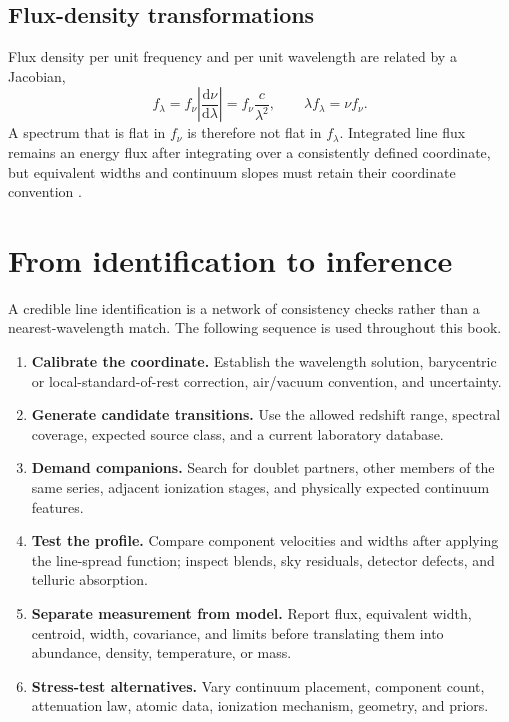 \subsection{Flux-density transformations}

Flux density per unit frequency and per unit wavelength are related by a Jacobian,
\begin{equation}
 f_\lambda = f_\nu\left|\frac{\mathrm d\nu}{\mathrm d\lambda}\right|
 =f_\nu\frac{c}{\lambda^2},
 \qquad \lambda f_\lambda=\nu f_\nu.
\end{equation}
A spectrum that is flat in $f_\nu$ is therefore not flat in $f_\lambda$.
Integrated line flux remains an energy flux after integrating over a consistently
defined coordinate, but equivalent widths and continuum slopes must retain their
coordinate convention \citep{RybickiLightman1979}.

\section{From identification to inference}

A credible line identification is a network of consistency checks rather than a
nearest-wavelength match.  The following sequence is used throughout this book.

\begin{enumerate}[label=\textbf{Step \arabic*:},leftmargin=*]
  \item \textbf{Calibrate the coordinate.} Establish the wavelength solution,
  barycentric or local-standard-of-rest correction, air/vacuum convention, and
  uncertainty.
  \item \textbf{Generate candidate transitions.} Use the allowed redshift range,
  spectral coverage, expected source class, and a current laboratory database.
  \item \textbf{Demand companions.} Search for doublet partners, other members of
  the same series, adjacent ionization stages, and physically expected continuum
  features.
  \item \textbf{Test the profile.} Compare component velocities and widths after
  applying the line-spread function; inspect blends, sky residuals, detector
  defects, and telluric absorption.
  \item \textbf{Separate measurement from model.} Report flux, equivalent width,
  centroid, width, covariance, and limits before translating them into abundance,
  density, temperature, or mass.
  \item \textbf{Stress-test alternatives.} Vary continuum placement, component
  count, attenuation law, atomic data, ionization mechanism, geometry, and priors.
\end{enumerate}


